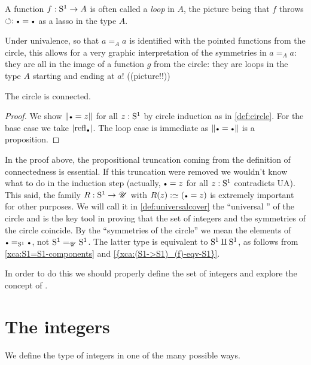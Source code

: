 \begin{remark}
A function $f:{\mathrm{S}^1}\to A$ is often called a \emph{loop} in $A$, 
the picture being that $f$ throws $\Sloop:\base=\base$ as a lasso in the type $A$.

  Under univalence, so that $a=_Aa$ is identified with the pointed functions 
from the circle, this allows for a very graphic interpretation of the 
symmetries in $a=_Aa$: they are all in the image of a function $g$ from 
the circle: they are loops in the type $A$ starting and ending at $a$! ((picture!!))
\end{remark}

\begin{lemma}\label{lem:circleisconnected}
  The circle is connected.
\end{lemma}
\begin{proof}
We show $\Trunc{\base=z}$ for all $z:{\mathrm{S}^1}$ by circle induction
as in \cref{def:circle}.
For the base case we take $\trunc{\refl{\base}}$.
The loop case is immediate as $\Trunc{\base=\base}$ is a proposition.
\end{proof}

In the proof above, the propositional truncation coming 
from the definition of connectedness is essential.
If this truncation were removed we wouldn't know what to do in
the induction step (actually, ${\base=z}$ for all $z:{\mathrm{S}^1}$ contradicts UA).
This said, the family $R:{\mathrm{S}^1}\to{\mathscr{U}}$ with $R(z)\defequi (\base=z)$ is extremely 
important for other purposes. We will call it in \cref{def:universalcover} the 
``universal \covering'' of the circle and is the key tool in proving that 
the set of integers and the symmetries of the circle coincide.
By the ``symmetries of the circle'' we mean the elements of $\base=_{\Sc}\base$,
not ${\mathrm{S}^1}=_{{\mathscr{U}}}{\mathrm{S}^1}$. The latter type is equivalent to ${\mathrm{S}^1}\amalg{\mathrm{S}^1}$,
as follows from \cref{xca:S1=S1-components} and \cref{{xca:(S1->S1)_(f)-eqv-S1}}.



In order to do this we should properly define the set of integers 
and explore the concept of \coverings.

\section{The integers}
\label{sec:integers}

We define the type of integers in one of the many possible ways.

